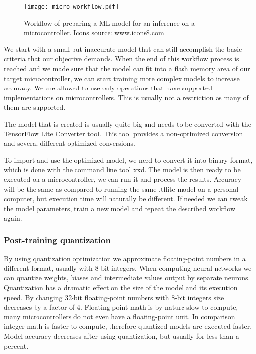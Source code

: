 \begin{figure}[ht] 
    \centering
    \texttt{[image: micro\_workflow.pdf]} 
    \caption{  Workflow of preparing a ML model for an inference on a microcontroller. Icons source: www.icons8.com}
    \label{micro_workflow}
\end{figure}

We start with a small but inaccurate model that can still accomplish the basic criteria that our objective demands.
When the end of this workflow process is reached and we made sure that the model can fit into a flash memory area of our target microcontroller, we can start training more complex models to increase accuracy.
We are allowed to use only operations that have supported implementations on microcontrollers.
This is usually not a restriction as many of them are supported.

The model that is created is usually quite big and needs to be converted with the TensorFlow Lite Converter tool.
This tool provides a non-optimized conversion and several different optimized conversions.

To import and use the optimized model, we need to convert it into binary format, which is done with the command line tool xxd.
The model is then ready to be executed on a microcontroller, we can run it and process the results.
Accuracy will be the same as compared to running the same .tflite model on a personal computer, but execution time will naturally be different.
If needed we can tweak the model parameters, train a new model and repeat the described workflow again.


\subsubsection{ Post-training quantization}

By using quantization optimization we approximate floating-point numbers in a different format, usually with 8-bit integers.
When computing neural networks we can quantize weights, biases and intermediate values output by separate neurons. 
Quantization has a dramatic effect on the size of the model and its execution speed.
By changing 32-bit floating-point numbers with 8-bit integers size decreases by a factor of 4.
Floating-point math is by nature slow to compute, many microcontrollers do not even have a floating-point unit.
In comparison integer math is faster to compute, therefore quantized models are executed faster.
Model accuracy decreases after using quantization, but usually for less than a percent.
 

